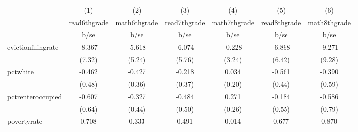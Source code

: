 {
\def\sym#1{\ifmmode^{#1}\else\(^{#1}\)\fi}
\begin{tabular}{l*{6}{c}}
\hline\hline
            &\multicolumn{1}{c}{(1)}           &\multicolumn{1}{c}{(2)}           &\multicolumn{1}{c}{(3)}           &\multicolumn{1}{c}{(4)}           &\multicolumn{1}{c}{(5)}           &\multicolumn{1}{c}{(6)}           \\
            &\multicolumn{1}{c}{read6thgrade}  &\multicolumn{1}{c}{math6thgrade}  &\multicolumn{1}{c}{read7thgrade}  &\multicolumn{1}{c}{math7thgrade}  &\multicolumn{1}{c}{read8thgrade}  &\multicolumn{1}{c}{math8thgrade}  \\
            &                     b/se         &                     b/se         &                     b/se         &                     b/se         &                     b/se         &                     b/se         \\
\hline
evictionfilingrate&                   -8.367         &                   -5.618         &                   -6.074         &                   -0.228         &                   -6.898         &                   -9.271         \\
            &                   (7.32)         &                   (5.24)         &                   (5.76)         &                   (3.24)         &                   (6.42)         &                   (9.28)         \\
pctwhite    &                   -0.462         &                   -0.427         &                   -0.218         &                    0.034         &                   -0.561         &                   -0.390         \\
            &                   (0.48)         &                   (0.36)         &                   (0.37)         &                   (0.20)         &                   (0.44)         &                   (0.59)         \\
pctrenteroccupied&                   -0.607         &                   -0.327         &                   -0.484         &                    0.271         &                   -0.184         &                   -0.586         \\
            &                   (0.64)         &                   (0.44)         &                   (0.50)         &                   (0.26)         &                   (0.55)         &                   (0.79)         \\
povertyrate &                    0.708         &                    0.333         &                    0.491         &                    0.014         &                    0.677         &                    0.870         \\

\end{tabular}}
